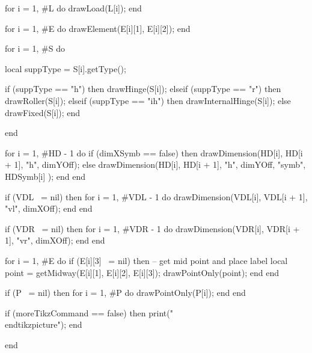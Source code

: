 \begin{luacode}
	for i = 1, #L do
		drawLoad(L[i]);
	end
	
	for i = 1, #E do
		drawElement(E[i][1], E[i][2]);
	end
	
	for i = 1, #S do
	
		local suppType = S[i].getType();
		
		if (suppType == "h") then
			drawHinge(S[i]);
		elseif (suppType == "r") then
			drawRoller(S[i]);
		elseif (suppType == "ih") then
			drawInternalHinge(S[i]);
		else
			drawFixed(S[i]);
		end
		
	end

	for i = 1, #HD - 1 do
		if (dimXSymb == false) then
			drawDimension(HD[i], HD[i + 1], "h", dimYOff);
		else
			drawDimension(HD[i], HD[i + 1], "h", dimYOff, "symb", HDSymb[i] );
		end
	end

	if (VDL ~= nil) then
		for i = 1, #VDL - 1 do
			drawDimension(VDL[i], VDL[i + 1], "vl", dimXOff);
		end
	end

	if (VDR ~= nil) then
		for i = 1, #VDR - 1 do
			drawDimension(VDR[i], VDR[i + 1], "vr", dimXOff);
		end
	end
	
	for i = 1, #E do
		if (E[i][3] ~= nil) then
			-- get mid point and place label
			local point = getMidway(E[i][1], E[i][2], E[i][3]);
			drawPointOnly(point);
		end
	end
	
	if (P ~= nil) then
		for i = 1, #P do
			drawPointOnly(P[i]);
		end
	end
	
	if (moreTikzCommand == false) then
		print("\\end{tikzpicture}");
	end
	
end

\end{luacode}
